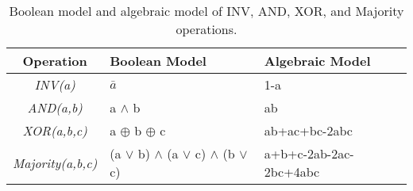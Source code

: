 
\begin{table}[!htb]
\color{red}
\centering
\caption{Boolean model and algebraic model of INV, AND, XOR, and Majority operations.}
\label{tbl:model}
\begin{tabular}{|c|l|l|}
\hline
Operation & Boolean Model & Algebraic Model \\ \hline
\textit{INV(a)} & $\bar{a}$ & 1-a \\ \hline
\textit{AND(a,b)} & a $\wedge$ b & ab \\ \hline
\textit{XOR(a,b,c)} & a $\oplus$ b $\oplus$ c & ab+ac+bc-2abc \\ \hline
\textit{Majority(a,b,c)} & (a $\vee$ b) $\wedge$ (a $\vee$ c) $\wedge$ (b $\vee$ c) & a+b+c-2ab-2ac-2bc+4abc \\ \hline
\end{tabular}
\end{table}

